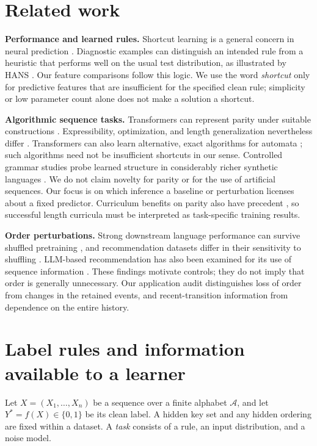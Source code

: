 \documentclass[10pt]{article}
\begin{document}
\section{Related work}
\label{sec:related}
\textbf{Performance and learned rules.} Shortcut learning is a general concern in neural prediction \citep{geirhos2020}. Diagnostic examples can distinguish an intended rule from a heuristic that performs well on the usual test distribution, as illustrated by HANS \citep{mccoy2019}. Our feature comparisons follow this logic. We use the word \emph{shortcut} only for predictive features that are insufficient for the specified clean rule; simplicity or low parameter count alone does not make a solution a shortcut.

\textbf{Algorithmic sequence tasks.} Transformers can represent parity under suitable constructions \citep{chiang2022}. Expressibility, optimization, and length generalization nevertheless differ \citep{hahn2024,deletang2023}. Transformers can also learn alternative, exact algorithms for automata \citep{liu2023automata}; such algorithms need not be insufficient shortcuts in our sense. Controlled grammar studies probe learned structure in considerably richer synthetic languages \citep{allenzhu2023}. We do not claim novelty for parity or for the use of artificial sequences. Our focus is on which inference a baseline or perturbation licenses about a fixed predictor. Curriculum benefits on parity also have precedent \citep{abbe2023}, so successful length curricula must be interpreted as task-specific training results.

\textbf{Order perturbations.} Strong downstream language performance can survive shuffled pretraining \citep{sinha2021}, and recommendation datasets differ in their sensitivity to shuffling \citep{klenitskiy2024}. LLM-based recommendation has also been examined for its use of sequence information \citep{kim2025}. These findings motivate controls; they do not imply that order is generally unnecessary. Our application audit distinguishes loss of order from changes in the retained events, and recent-transition information from dependence on the entire history.

\section{Label rules and information available to a learner}
\label{sec:rules}
Let $X=(X_1,\ldots,X_n)$ be a sequence over a finite alphabet $\mathcal A$, and let $Y^*=f(X)\in\{0,1\}$ be its clean label. A hidden key set and any hidden ordering are fixed within a dataset. A \emph{task} consists of a rule, an input distribution, and a noise model.
\end{document}
